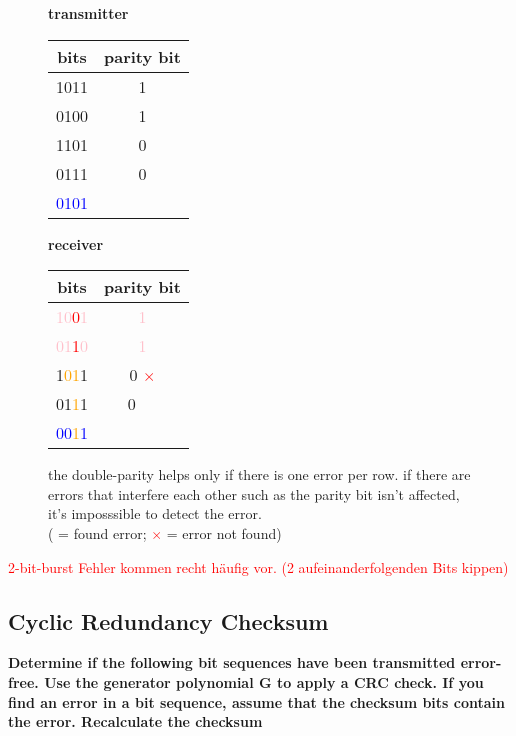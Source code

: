 \documentclass[a4paper,12pt]{article}
\begin{document}
	\begin{figure}[h!]
		\begin{minipage}{0.3\linewidth}
			\textbf{transmitter}\\
			\begin{tabular}{c|c}
				 bits & parity bit \\ \hline
				 1011 & 1 \\
				 0100 & 1 \\
				 1101 & 0 \\
				 0111 & 0 \\ \hline
				 \textcolor{blue}{0101} & \\ 
			\end{tabular}
		\end{minipage}
	\hfill
	\begin{minipage}{0.3\linewidth}
		\textbf{receiver}\\
		\begin{tabular}{c|c}
			bits & parity bit \\ \hline
			\textcolor{pink}{10\textcolor{red}{0}1} & \textcolor{pink}{1} \textcolor{green}{\checkmark} \\
			\textcolor{pink}{01\textcolor{red}{1}0} & \textcolor{pink}{1} \textcolor{green}{\checkmark} \\
			1\textcolor{orange}{01}1 & 0 \textcolor{red}{$\times$} \\
			01\textcolor{orange}{1}1 & 0 ~~ \\ \hline
			\textcolor{blue}{00\textcolor{orange}{1}1} & \\ 
		\end{tabular}
	\end{minipage}
	\hfill
	\begin{minipage}{0.36\linewidth}
		the double-parity helps only if there is one error per row. if there are errors that interfere each other such as the parity bit isn't affected, it's imposssible to detect the error.\\
		(\textcolor{green}{\checkmark} = found error; \textcolor{red}{$\times$} = error not found)
	\end{minipage}
	\end{figure}
	
	\textcolor{red}{2-bit-burst Fehler kommen recht häufig vor. (2 aufeinanderfolgenden Bits kippen)}
	\pagebreak
	
	\subsection{Cyclic Redundancy Checksum}
	\textbf{Determine if the following bit sequences have been transmitted error-free.  Use the generator polynomial G	to apply a CRC check. If you find an error in a bit sequence,  assume that the checksum bits contain the error. Recalculate the checksum\\}
		
\end{document}
